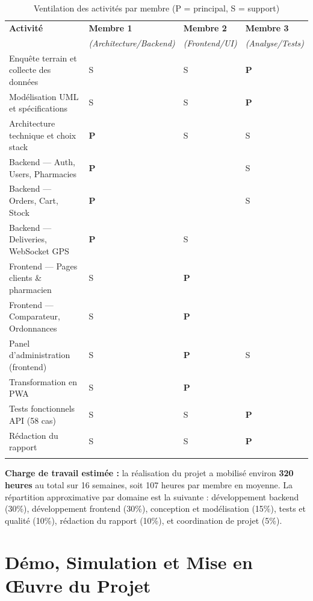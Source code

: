 \documentclass[12pt,a4paper,oneside]{report}
\begin{document}
\begin{longtable}{L{5.5cm}C{2.8cm}C{2.8cm}C{2.8cm}}
  \toprule
  \textbf{Activité} & \textbf{Membre 1} & \textbf{Membre 2} & \textbf{Membre 3} \\
  & \small\textit{(Architecture/Backend)} & \small\textit{(Frontend/UI)} & \small\textit{(Analyse/Tests)} \\
  \midrule
  Enquête terrain et collecte des données & S & S & \textbf{P} \\
  Modélisation UML et spécifications & S & S & \textbf{P} \\
  Architecture technique et choix stack & \textbf{P} & S & S \\
  Backend — Auth, Users, Pharmacies & \textbf{P} & & S \\
  Backend — Orders, Cart, Stock & \textbf{P} & & S \\
  Backend — Deliveries, WebSocket GPS & \textbf{P} & S & \\
  Frontend — Pages clients \& pharmacien & S & \textbf{P} & \\
  Frontend — Comparateur, Ordonnances & S & \textbf{P} & \\
  Panel d'administration (frontend) & S & \textbf{P} & S \\
  Transformation en PWA & S & \textbf{P} & \\
  Tests fonctionnels API (58 cas) & S & S & \textbf{P} \\
  Rédaction du rapport & S & S & \textbf{P} \\
  \bottomrule
  \caption{Ventilation des activités par membre (P = principal, S = support)}
\end{longtable}

\textbf{Charge de travail estimée :} la réalisation du projet a mobilisé environ \textbf{320 heures} au total sur 16 semaines, soit 107 heures par membre en moyenne. La répartition approximative par domaine est la suivante : développement backend (30\%), développement frontend (30\%), conception et modélisation (15\%), tests et qualité (10\%), rédaction du rapport (10\%), et coordination de projet (5\%).

\clearpage

\chapter{Démo, Simulation et Mise en Œuvre du Projet}
\end{document}
